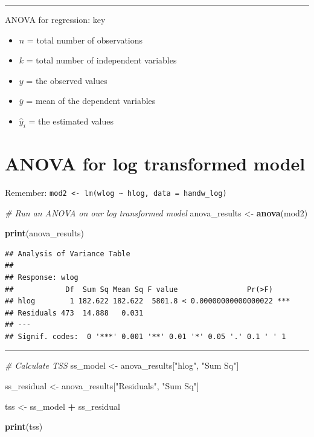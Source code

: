 \documentclass[
]{article}
\newenvironment{Shaded}{\begin{snugshade}}{\end{snugshade}}
\newcommand{\CommentTok}[1]{\textcolor[rgb]{0.56,0.35,0.01}{\textit{#1}}}
\newcommand{\FunctionTok}[1]{\textcolor[rgb]{0.13,0.29,0.53}{\textbf{#1}}}
\newcommand{\NormalTok}[1]{#1}
\newcommand{\OtherTok}[1]{\textcolor[rgb]{0.56,0.35,0.01}{#1}}
\newcommand{\SpecialCharTok}[1]{\textcolor[rgb]{0.81,0.36,0.00}{\textbf{#1}}}
\newcommand{\StringTok}[1]{\textcolor[rgb]{0.31,0.60,0.02}{#1}}
\providecommand{\tightlist}{%
  \setlength{\itemsep}{0pt}\setlength{\parskip}{0pt}}
\begin{document}
\begin{center}\rule{0.5\linewidth}{0.5pt}\end{center}

ANOVA for regression: key

\begin{itemize}
\tightlist
\item
  \(n\) = total number of observations
\item
  \(k\) = total number of independent variables
\item
  \(y\) = the observed values
\item
  \(\overline{y}\) = mean of the dependent variables
\item
  \(\hat{y}_{i}\) = the estimated values
\end{itemize}

\hypertarget{anova-for-log-transformed-model}{%
\section{ANOVA for log transformed
model}\label{anova-for-log-transformed-model}}

Remember:
\texttt{mod2\ \textless{}-\ lm(wlog\ \textasciitilde{}\ hlog,\ data\ =\ handw\_log)}

\begin{Shaded}
\begin{Highlighting}[]
\CommentTok{\# Run an ANOVA on our log transformed model}
\NormalTok{anova\_results }\OtherTok{\textless{}{-}}
  \FunctionTok{anova}\NormalTok{(mod2)}

\FunctionTok{print}\NormalTok{(anova\_results)}
\end{Highlighting}
\end{Shaded}

\begin{verbatim}
## Analysis of Variance Table
## 
## Response: wlog
##            Df  Sum Sq Mean Sq F value                Pr(>F)    
## hlog        1 182.622 182.622  5801.8 < 0.00000000000000022 ***
## Residuals 473  14.888   0.031                                  
## ---
## Signif. codes:  0 '***' 0.001 '**' 0.01 '*' 0.05 '.' 0.1 ' ' 1
\end{verbatim}

\begin{center}\rule{0.5\linewidth}{0.5pt}\end{center}

\begin{Shaded}
\begin{Highlighting}[]
\CommentTok{\# Calculate TSS}
\NormalTok{ss\_model }\OtherTok{\textless{}{-}}
\NormalTok{  anova\_results[}\StringTok{"hlog"}\NormalTok{, }\StringTok{"Sum Sq"}\NormalTok{]}

\NormalTok{ss\_residual }\OtherTok{\textless{}{-}}
\NormalTok{  anova\_results[}\StringTok{"Residuals"}\NormalTok{, }\StringTok{"Sum Sq"}\NormalTok{]}

\NormalTok{tss }\OtherTok{\textless{}{-}} 
\NormalTok{  ss\_model }\SpecialCharTok{+}\NormalTok{ ss\_residual}

\FunctionTok{print}\NormalTok{(tss)}
\end{Highlighting}
\end{Shaded}
\end{document}

